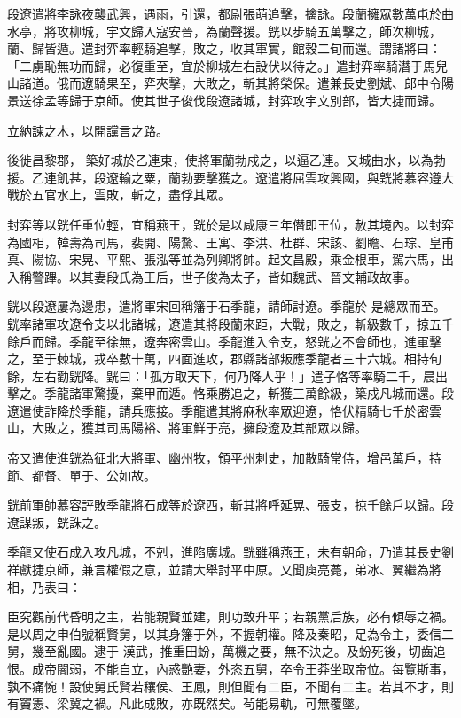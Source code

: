 \begin{pinyinscope}
 段遼遣將李詠夜襲武興，遇雨，引還，都尉張萌追擊，擒詠。段蘭擁眾數萬屯於曲水亭，將攻柳城，宇文歸入寇安晉，為蘭聲援。皝以步騎五萬擊之，師次柳城，蘭、歸皆遁。遣封弈率輕騎追擊，敗之，收其軍實，館穀二旬而還。謂諸將曰：「二虜恥無功而歸，必復重至，宜於柳城左右設伏以待之。」遣封弈率騎潛于馬兒山諸道。俄而遼騎果至，弈夾擊，大敗之，斬其將榮保。遣兼長史劉斌、郎中令陽景送徐孟等歸于京師。使其世子俊伐段遼諸城，封弈攻宇文別部，皆大捷而歸。



 立納諫之木，以開讜言之路。



 後徙昌黎郡，
 築好城於乙連東，使將軍蘭勃戍之，以逼乙連。又城曲水，以為勃援。乙連飢甚，段遼輸之粟，蘭勃要擊獲之。遼遣將屈雲攻興國，與皝將慕容遵大戰於五官水上，雲敗，斬之，盡俘其眾。



 封弈等以皝任重位輕，宜稱燕王，皝於是以咸康三年僭即王位，赦其境內。以封弈為國相，韓壽為司馬，裴開、陽騖、王寓、李洪、杜群、宋該、劉瞻、石琮、皇甫真、陽協、宋晃、平熙、張泓等並為列卿將帥。起文昌殿，乘金根車，駕六馬，出入稱警蹕。以其妻段氏為王后，世子俊為太子，皆如魏武、晉文輔政故事。



 皝以段遼屢為邊患，遣將軍宋回稱籓于石季龍，請師討遼。季龍於
 是總眾而至。皝率諸軍攻遼令支以北諸城，遼遣其將段蘭來距，大戰，敗之，斬級數千，掠五千餘戶而歸。季龍至徐無，遼奔密雲山。季龍進入令支，怒皝之不會師也，進軍擊之，至于棘城，戎卒數十萬，四面進攻，郡縣諸部叛應季龍者三十六城。相持旬餘，左右勸皝降。皝曰：「孤方取天下，何乃降人乎！」遣子恪等率騎二千，晨出擊之。季龍諸軍驚擾，棄甲而遁。恪乘勝追之，斬獲三萬餘級，築戍凡城而還。段遼遣使詐降於季龍，請兵應接。季龍遣其將麻秋率眾迎遼，恪伏精騎七千於密雲山，大敗之，獲其司馬陽裕、將軍鮮于亮，擁段遼及其部眾以歸。



 帝又遣使進皝為征北大將軍、幽州牧，領平州刺史，加散騎常侍，增邑萬戶，持節、都督、單于、公如故。



 皝前軍帥慕容評敗季龍將石成等於遼西，斬其將呼延晃、張支，掠千餘戶以歸。段遼謀叛，皝誅之。



 季龍又使石成入攻凡城，不剋，進陷廣城。皝雖稱燕王，未有朝命，乃遣其長史劉祥獻捷京師，兼言權假之意，並請大舉討平中原。又聞庾亮薨，弟冰、翼繼為將相，乃表曰：



 臣究觀前代昏明之主，若能親賢並建，則功致升平；若親黨后族，必有傾辱之禍。是以周之申伯號稱賢舅，以其身籓于外，不握朝權。降及秦昭，足為令主，委信二舅，幾至亂國。逮于
 漢武，推重田蚡，萬機之要，無不決之。及蚡死後，切齒追恨。成帝闇弱，不能自立，內惑艷妻，外恣五舅，卒令王莽坐取帝位。每覽斯事，孰不痛惋！設使舅氏賢若穰侯、王鳳，則但聞有二臣，不聞有二主。若其不才，則有竇憲、梁冀之禍。凡此成敗，亦既然矣。茍能易軌，可無覆墜。




\end{pinyinscope}
